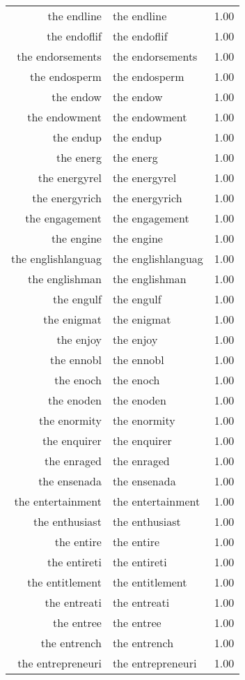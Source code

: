 \begin{table}[ht]
\begin{tabular}{rlr}
  the endline & the endline & 1.00 \\ 
  the endoflif & the endoflif & 1.00 \\ 
  the endorsements & the endorsements & 1.00 \\ 
  the endosperm & the endosperm & 1.00 \\ 
  the endow & the endow & 1.00 \\ 
  the endowment & the endowment & 1.00 \\ 
  the endup & the endup & 1.00 \\ 
  the energ & the energ & 1.00 \\ 
  the energyrel & the energyrel & 1.00 \\ 
  the energyrich & the energyrich & 1.00 \\ 
  the engagement & the engagement & 1.00 \\ 
  the engine & the engine & 1.00 \\ 
  the englishlanguag & the englishlanguag & 1.00 \\ 
  the englishman & the englishman & 1.00 \\ 
  the engulf & the engulf & 1.00 \\ 
  the enigmat & the enigmat & 1.00 \\ 
  the enjoy & the enjoy & 1.00 \\ 
  the ennobl & the ennobl & 1.00 \\ 
  the enoch & the enoch & 1.00 \\ 
  the enoden & the enoden & 1.00 \\ 
  the enormity & the enormity & 1.00 \\ 
  the enquirer & the enquirer & 1.00 \\ 
  the enraged & the enraged & 1.00 \\ 
  the ensenada & the ensenada & 1.00 \\ 
  the entertainment & the entertainment & 1.00 \\ 
  the enthusiast & the enthusiast & 1.00 \\ 
  the entire & the entire & 1.00 \\ 
  the entireti & the entireti & 1.00 \\ 
  the entitlement & the entitlement & 1.00 \\ 
  the entreati & the entreati & 1.00 \\ 
  the entree & the entree & 1.00 \\ 
  the entrench & the entrench & 1.00 \\ 
  the entrepreneuri & the entrepreneuri & 1.00 \\ 

\end{tabular}
\end{table}
